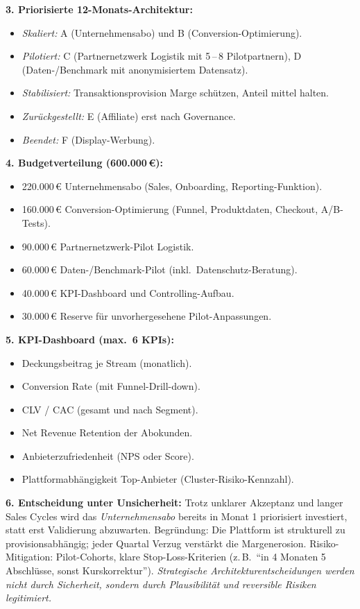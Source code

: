 \documentclass[11pt,a4paper,oneside]{article}
\begin{document}
\begin{loesungbox}
\textbf{3. Priorisierte 12-Monats-Architektur:}
\begin{itemize}
  \item \emph{Skaliert:} A (Unternehmensabo) und B (Conversion-Optimierung).
  \item \emph{Pilotiert:} C (Partnernetzwerk Logistik mit 5\,--\,8 Pilotpartnern), D (Daten-/Benchmark mit anonymisiertem Datensatz).
  \item \emph{Stabilisiert:} Transaktionsprovision \textendash{} Marge schützen, Anteil mittel halten.
  \item \emph{Zurückgestellt:} E (Affiliate) \textendash{} erst nach Governance.
  \item \emph{Beendet:} F (Display-Werbung).
\end{itemize}

\textbf{4. Budgetverteilung (600.000\,\euro):}
\begin{itemize}
  \item 220.000\,\euro{} \textendash{} Unternehmensabo (Sales, Onboarding, Reporting-Funktion).
  \item 160.000\,\euro{} \textendash{} Conversion-Optimierung (Funnel, Produktdaten, Checkout, A/B-Tests).
  \item 90.000\,\euro{} \textendash{} Partnernetzwerk-Pilot Logistik.
  \item 60.000\,\euro{} \textendash{} Daten-/Benchmark-Pilot (inkl.\ Datenschutz-Beratung).
  \item 40.000\,\euro{} \textendash{} KPI-Dashboard und Controlling-Aufbau.
  \item 30.000\,\euro{} \textendash{} Reserve für unvorhergesehene Pilot-Anpassungen.
\end{itemize}

\textbf{5. KPI-Dashboard (max.\ 6 KPIs):}
\begin{itemize}
  \item Deckungsbeitrag je Stream (monatlich).
  \item Conversion Rate (mit Funnel-Drill-down).
  \item CLV / CAC (gesamt und nach Segment).
  \item Net Revenue Retention der Abokunden.
  \item Anbieterzufriedenheit (NPS oder Score).
  \item Plattformabhängigkeit Top-Anbieter (Cluster-Risiko-Kennzahl).
\end{itemize}

\textbf{6. Entscheidung unter Unsicherheit:}
Trotz unklarer Akzeptanz und langer Sales Cycles wird das \emph{Unternehmensabo} bereits in Monat 1 priorisiert investiert, statt erst Validierung abzuwarten. Begründung: Die Plattform ist strukturell zu provisionsabhängig; jeder Quartal Verzug verstärkt die Margenerosion. Risiko-Mitigation: Pilot-Cohorts, klare Stop-Loss-Kriterien (z.\,B.\ ``in 4 Monaten 5 Abschlüsse, sonst Kurskorrektur''). \emph{Strategische Architekturentscheidungen werden nicht durch Sicherheit, sondern durch Plausibilität und reversible Risiken legitimiert.}
\end{loesungbox}
\end{document}

